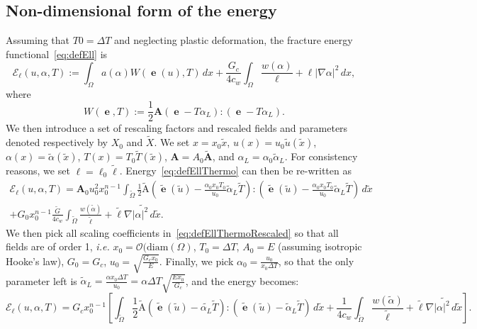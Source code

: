 \documentclass[10pt,oneside]{memoir}
\DeclareMathOperator{\e}{{\mathbf e}}
\begin{document}
\subsection{Non-dimensional form of the energy}
Assuming that $T0 = \Delta T$ and neglecting plastic deformation, the fracture energy functional~\eqref{eq:defEll} is
\begin{equation}
	\label{eq:defEllThermo}
	\mathcal{E}_\ell(u,\alpha,T) := \int_\Omega a(\alpha) W(\e(u),T)\, dx +  \frac{G_c}{4c_w} \int_\Omega \frac{w(\alpha)}{\ell} + \ell|\nabla \alpha|^2\, dx,
\end{equation}
where 
$$
W(\e,T) := \frac{1}{2} \mathbf{A}\left(\e-T \alpha_L\right):\left(\e-T \alpha_L\right).
$$
We then introduce a set of rescaling factors and rescaled fields and parameters denoted respectively by $X_0$ and $\tilde{X}$. 
We set $x = x_0 \tilde{x}$, $u (x)= u_0 \tilde{u}(\tilde{x})$, $\alpha(x) = \tilde{\alpha}(\tilde{x})$, $T(x) = T_0 \tilde{T}(\tilde{x})$, $\mathbf{A} = A_0 \tilde{\mathbf{A}}$, and $\alpha_L = \alpha_0 \tilde{\alpha}_L$. 
For consistency reasons, we set $\ell = \ell_0 \tilde{\ell}$. Energy~\eqref{eq:defEllThermo} can then be re-written as
\begin{multline}
\mathcal{E}_\ell(u,\alpha,T) = \mathbf{A}_0 u_0^2x_0^{n-1}\int_{\tilde{\Omega}} \frac{1}{2}\tilde{\mathrm{A}} \left(\tilde{\e}(\tilde{u}) - \frac{\alpha_0x_0T_0}{u_0}\tilde{\alpha}_L\tilde{T}\right):\left(\tilde{\e}(\tilde{u}) - \frac{\alpha_0x_0T_0}{u_0}\tilde{\alpha}_L\tilde{T}\right)\, d\tilde{x} \\
+G_0x_0^{n-1}\frac{\tilde{G}}{4c_w} \int_{\tilde{\Omega}} \frac{w(\tilde{\alpha})}{\tilde{\ell}} + \tilde{\ell} \tilde{\nabla |\alpha|^2\, d\tilde{x}}.
\label{eq:defEllThermoRescaled}
\end{multline}
We then pick all scaling coefficients in~\eqref{eq:defEllThermoRescaled} so that all fields are of order 1, \emph{i.e.} $x_0 = \mathcal{O}(\mathrm{diam}(\Omega)$, $T_0 = \Delta T$, $A_0 = E$ (assuming isotropic Hooke's law), $G_0 = G_c$, $u_0 = \sqrt{\frac{G_cx_0}{E}}$. Finally, we pick $\alpha_0=\frac{u_0}{x_0\Delta T}$, so that the only parameter left is $\tilde{\alpha}_L = \frac{\alpha x_0 \Delta T}{u_0} = \alpha \Delta T\sqrt{\frac{E x_0}{G_c}}$, and the energy becomes:
\begin{equation}
\mathcal{E}_\ell(u,\alpha,T) = G_c x_0^{n-1}\left[\int_{\tilde{\Omega}} \frac{1}{2}\tilde{\mathrm{A}} \left(\tilde{\e}(\tilde{u}) - \tilde{\alpha_L}\tilde{T}\right):\left(\tilde{\e}(\tilde{u}) - \tilde{\alpha}_L\tilde{T}\right)\, d\tilde{x} 
+\frac{1}{4c_w} \int_{\tilde{\Omega}} \frac{w(\tilde{\alpha})}{\tilde{\ell}} + \tilde{\ell} \tilde{\nabla |\alpha|^2\, d\tilde{x}}\right].
\label{eq:defEllThermoRescaled2}
\end{equation}
\end{document}
